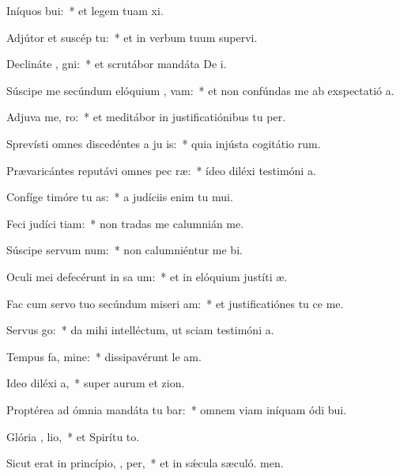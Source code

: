 \item Iníquos  bui:~* et legem tuam xi.
\item Adjútor et suscép   tu:~* et in verbum tuum supervi.
\item Declináte  , gni:~* et scrutábor mandáta De i.
\item Súscipe me secúndum elóquium ,  vam:~* et non confúndas me ab exspectatió a.
\item Adjuva me,   ro:~* et meditábor in justificatiónibus tu per.
\item Sprevísti omnes discedéntes a ju is:~* quia injústa cogitátio rum.
\item Prævaricántes reputávi omnes pec ræ:~* ídeo diléxi testimóni a.
\item Confíge timóre tu  as:~* a judíciis enim tu mui.
\item Feci judíci  tiam:~* non tradas me calumnián me.
\item Súscipe servum   num:~* non calumniéntur me bi.
\item Oculi mei defecérunt in sa um:~* et in elóquium justíti æ.
\item Fac cum servo tuo secúndum miseri am:~* et justificatiónes tu ce me.
\item Servus   go:~* da mihi intelléctum, ut sciam testimóni a.
\item Tempus fa, mine:~* dissipavérunt le am.
\item Ideo diléxi  a,~* super aurum et zion.
\item Proptérea ad ómnia mandáta tu bar:~* omnem viam iníquam ódi bui.
\item Glória ,  lio,~* et Spirítu to.
\item Sicut erat in princípio,  ,  per,~* et in sǽcula sæculó. men.
